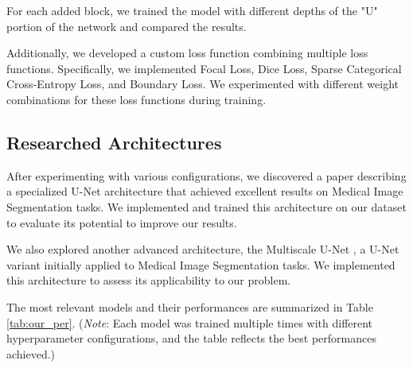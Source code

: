 \documentclass[11pt]{article}
\begin{document}
\begin{multicols}{2}
    For each added block, we trained the model with different depths of the "U" portion of the network and compared the results.

    Additionally, we developed a custom loss function combining multiple loss functions. Specifically, we implemented Focal Loss, Dice Loss, Sparse Categorical Cross-Entropy Loss, and Boundary Loss. We experimented with different weight combinations for these loss functions during training.

    \subsection{Researched Architectures}

    After experimenting with various configurations, we discovered a paper describing a specialized U-Net architecture \cite{huang2020unet3fullscaleconnected} that achieved excellent results on Medical Image Segmentation tasks. We implemented and trained this architecture on our dataset to evaluate its potential to improve our results.

    We also explored another advanced architecture, the Multiscale U-Net \cite{su2021msunet}, a U-Net variant initially applied to Medical Image Segmentation tasks. We implemented this architecture to assess its applicability to our problem.

    The most relevant models and their performances are summarized in Table \ref{tab:our_per}. (\textit{Note}: Each model was trained multiple times with different hyperparameter configurations, and the table reflects the best performances achieved.)


\end{multicols}
\end{document}
